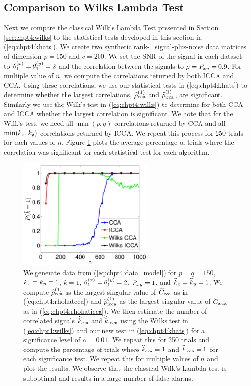 \subsection{Comparison to Wilks Lambda Test}

Next we compare the classical Wilk's Lambda Test presented in Section
\ref{sec:chpt4:wilks} to the statistical tests developed in this section in
(\ref{eq:chpt4:khats}). We create two synthetic rank-1 signal-plus-noise data matrices of
dimension $p=150$ and $q=200$. We set the SNR of the signal in each dataset to
$\theta^{(x)}_1=\theta^{(y)}_1=2$ and the correlation between the signals to
$\rho=P_{xy}=0.9$. For multiple value of $n$, we compute the correlations
returned by both ICCA and CCA. Using these correlations, we use our statistical tests in
(\ref{eq:chpt4:khats}) to determine whether the largest correlations, $\widehat{\rho}_\text{cca}^{(1)}$
and $\widehat{\rho}_\text{icca}^{(1)}$, are significant. Similarly we use the Wilk's test in
(\ref{eq:chpt4:wilks}) to determine for both CCA and ICCA whether the largest correlation
is significant. We note that for the Wilk's test, we need all $\min(p,q)$ correlations
returned by CCA and all $\min(k_x,k_y)$ correlations returned by ICCA. We repeat this
process for 250 trials for each values of $n$. Figure \ref{fig:chpt4_wilks} plots the
average percentage of trials where the correlation was significant for each statistical
test for each algorithm.

\begin{figure}
  \begin{center}
    \includegraphics[width=0.6\textwidth]{chpt4_det_corr/figs/wilks_comp.pdf}
    \caption{We generate data from (\ref{eq:chpt4:data_model}) for $p=q=150$,
      $k_x=k_y=1$, $k=1$, $\theta^{(x)}_1=\theta^{(y)}_1=2$, $P_{xy}=1$, and $\widehat{k}_x=\widehat{k}_y=1$. We compute
      $\widehat{\rho}_\text{cca}^{(1)}$ as the largest singular value of $\widehat{C}_{\text{cca}}$ as in
      (\ref{eq:chpt4:rhohatcca}) and $\widehat{\rho}_\text{icca}^{(1)}$ as the largest singular value of
      $\widehat{C}_{\text{icca}}$ as in (\ref{eq:chpt4:rhohaticca}). We then estimate the number of
      correlated signals $\widehat{k}_{\text{cca}}$ and $\widehat{k}_{\text{icca}}$ using the Wilks test in
      (\ref{eq:chpt4:wilks}) and our new test in (\ref{eq:chpt4:khats}) for a significance
      level of $\alpha=0.01$. We repeat this for 250 trials and compute the percentage of
      trials where $\widehat{k}_{\text{cca}}=1$ and $\widehat{k}_{\text{icca}}=1$ for each significance test. We repeat
      this for multiple values of $n$ and plot the results. We observe that the classical
      Wilk's Lambda test is suboptimal and results in a large number of false alarms.}
    \label{fig:chpt4_wilks}
  \end{center}
\end{figure}

